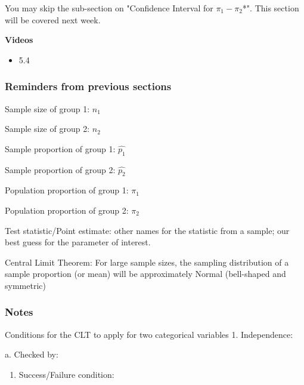 \documentclass[
]{report}
\providecommand{\tightlist}{%
  \setlength{\itemsep}{0pt}\setlength{\parskip}{0pt}}
\newcommand{\rgs}{\vspace{12pt}} %
\newcommand{\rgi}{\hspace{24pt}}  %
\begin{document}
You may skip the sub-section on "Confidence Interval for \(\pi_1 - \pi_2\)*". This section will be covered next week.


\textbf{Videos}

\begin{itemize}
\tightlist
\item
  5.4
\end{itemize}


\hypertarget{reminders-from-previous-sections-3}{%
\subsubsection*{Reminders from previous sections}\label{reminders-from-previous-sections-3}}

Sample size of group 1: \(n_1\)

Sample size of group 2: \(n_2\)

Sample proportion of group 1: \(\hat{p_1}\)

Sample proportion of group 2: \(\hat{p_2}\)

Population proportion of group 1: \(\pi_1\)

Population proportion of group 2: \(\pi_2\)

Test statistic/Point estimate: other names for the statistic from a sample; our best guess for the parameter of interest.

Central Limit Theorem: For large sample sizes, the sampling distribution of a sample proportion (or mean) will be approximately Normal (bell-shaped and symmetric)

\hypertarget{notes-20}{%
\subsubsection*{Notes}\label{notes-20}}

Conditions for the CLT to apply for two categorical variables
1. Independence:
\rgs

\rgi a. Checked by:
\rgs

\begin{enumerate}
\def\labelenumi{\arabic{enumi}.}
\setcounter{enumi}{1}
\tightlist
\item
  Success/Failure condition:
  \rgs
\end{enumerate}
\end{document}
